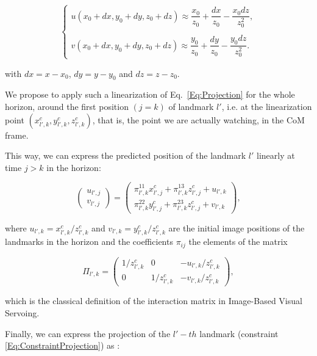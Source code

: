 $$
\left\{
\begin{array}{c}
\nonumber
 u(x_0+dx,y_0+dy,z_0+dz) \approx \dfrac{x_0}{z_0} +  \dfrac{dx}{z_0} - \dfrac{x_0 dz}{z_0^2},\\ \\
 v(x_0+dx,y_0+dy,z_0+dz) \approx \dfrac{y_0}{z_0} +  \dfrac{dy}{z_0} - \dfrac{y_0 dz}{z_0^2}.
\end{array}
\right.
$$

with $dx=x-x_0$, $dy=y-y_0$ and $dz=z-z_0$. 

We propose to apply such a linearization of Eq.~\ref{Eq:Projection} for the whole horizon, around the first position $(j=k)$ of landmark $l'$, i.e. at the linearization point $(x^{c}_{l',k},y^{c}_{l',k},z^{c}_{l',k})$, that is, the point we are actually watching, in the CoM frame. 

This way, we can express the predicted position of the landmark $l'$ linearly at time $j>k$ in the horizon:

\begin{equation*}
 \left(
 \begin{matrix}
  u_{l',j} \\
  v_{l',j}
 \end{matrix}
 \right)
 = \left(
 \begin{matrix}
  \pi^{11}_{l',k} x^{c}_{l',j} + \pi^{13}_{l',k} z^{c}_{l',j}+ u_{l',k}\\
  \pi^{22}_{l',k} y^{c}_{l',j} + \pi^{23}_{l',k} z^{c}_{l',j} + v_{l',k}
 \end{matrix}
 \right),
\end{equation*}

where $u_{l',k} = x^{c}_{l',k} / z^{c}_{l',k}$ and $v_{l',k} = y^{c}_{l',k} / z^{c}_{l',k}$ are the initial image positions of the landmarks in the horizon and the coefficients $\pi_{ij}$ the elements of the matrix

\begin{equation*}
\Pi_{l',k} = \left(
\begin{matrix}
 1/z^{c}_{l',k} & 0 & - u_{l',k} / z^{c}_{l',k} \\
 0 & 1/z^{c}_{l',k} & - v_{l',k} / z^{c}_{l',k}
\end{matrix}
\right),
\end{equation*}

which is the classical definition of the interaction matrix in Image-Based Visual Servoing.

Finally, we can express the projection of the $l'-th$ landmark (constraint \ref{Eq:ConstraintProjection}) as :

